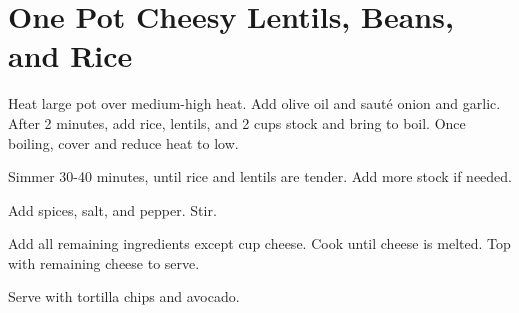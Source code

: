 \section{One Pot Cheesy Lentils, Beans, and Rice}
\begin{recipe}
	
	
	
	Heat large pot over medium-high heat. Add olive oil and saut\'{e} onion and garlic. After 2 minutes, add rice, lentils, and 2 cups stock and bring to boil. Once boiling, cover and reduce heat to low.
	
	Simmer 30-40 minutes, until rice and lentils are tender. Add more stock if needed.
	
	Add spices, salt, and pepper. Stir.
	
	Add all remaining ingredients except  cup cheese. Cook until cheese is melted. Top with remaining cheese to serve.
	
	

	Serve with tortilla chips and avocado.
	
\end{recipe}
